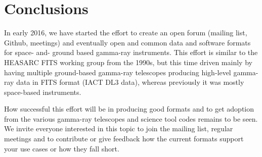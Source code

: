 \section{Conclusions}

In early 2016, we have started the \gadf effort to create an open forum (mailing list, Github, meetings) and eventually open and common data and software formats for space- and- ground based gamma-ray instruments. This effort is similar to the HEASARC FITS working group from the 1990s, but this time driven mainly by having multiple ground-based gamma-ray telescopes producing high-level gamma-ray data in FITS format (IACT DL3 data), whereas previously it was mostly space-based instruments.

How successful this effort will be in producing good formats and to get adoption from the various gamma-ray telescopes and science tool codes remains to be seen. We invite everyone interested in this topic to join the mailing list, regular meetings and to contribute or give feedback how the current formats support your use cases or how they fall short.
